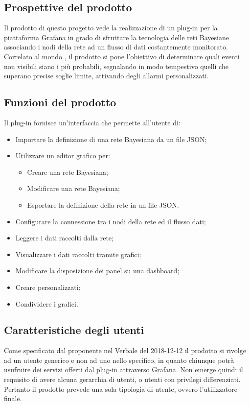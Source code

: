 
\subsection{Prospettive del prodotto}
Il prodotto di questo progetto vede la realizzazione di un plug-in per la piattaforma Grafana in grado di sfruttare la tecnologia delle reti Bayesiane associando i nodi della rete ad un flusso di dati costantemente monitorato. Correlato al mondo , il prodotto si pone l'obiettivo di  determinare quali eventi non visibili siano i più probabili, segnalando in modo tempestivo quelli che superano precise soglie limite, attivando degli allarmi personalizzati. 

\subsection{Funzioni del prodotto}
Il plug-in fornisce un'interfaccia che permette all'utente di:

\begin{itemize}
	\item Importare la definizione di una rete Bayesiana da un file JSON;
	\item Utilizzare un editor grafico per:
	\begin{itemize}
		\item Creare una rete Bayesiana;
		\item Modificare una rete Bayesiana;
		\item Esportare la definizione della rete in un file JSON.
	\end{itemize} 
	\item Configurare la connessione tra i nodi della rete ed il flusso dati;
	\item Leggere i dati raccolti dalla rete;
	\item Visualizzare i dati raccolti tramite grafici;
	\item Modificare la disposizione dei panel su una dashboard;
	\item Creare  personalizzati;
	\item Condividere i grafici.
\end{itemize}

\subsection{Caratteristiche degli utenti}
Come specificato dal proponente nel Verbale del 2018-12-12 il prodotto si rivolge ad un utente generico e non ad uno nello specifico, in quanto chiunque potrà usufruire dei servizi offerti dal plug-in attraverso Grafana. Non emerge quindi il requisito di avere alcuna gerarchia di utenti, o utenti con privilegi differenziati. Pertanto il prodotto prevede una sola tipologia di utente, ovvero l’utilizzatore finale.

